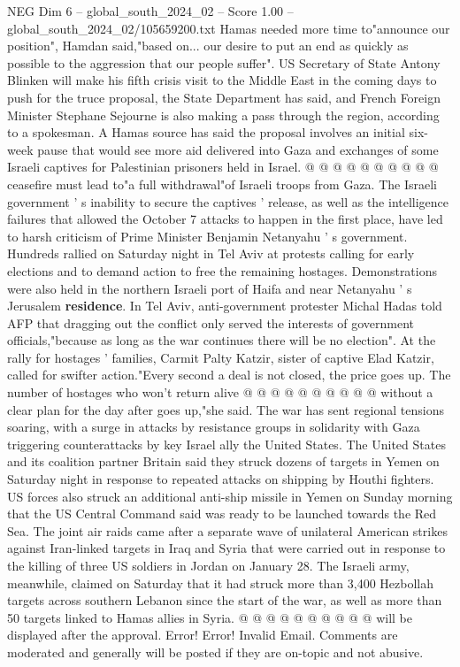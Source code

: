 \begin{textsample}{NEG Dim 6 – global\_south\_2024\_02 – Score 1.00 – global\_south\_2024\_02/105659200.txt}
Hamas needed more time to"announce our position", Hamdan said,"based on... our desire to put an end as quickly as possible to the aggression that our people suffer".
US Secretary of State Antony Blinken will make his fifth crisis visit to the Middle East in the coming days to push for the truce proposal, the State Department has said, and French Foreign Minister Stephane Sejourne is also making a pass through the region, according to a spokesman.
A Hamas source has said the proposal involves an initial six-week pause that would see more aid delivered into Gaza and exchanges of some Israeli captives for Palestinian prisoners held in Israel. @ @ @ @ @ @ @ @ @ @ ceasefire must lead to"a full withdrawal"of Israeli troops from Gaza.
The Israeli government ' s inability to secure the captives ' release, as well as the intelligence failures that allowed the October 7 attacks to happen in the first place, have led to harsh criticism of Prime Minister Benjamin Netanyahu ' s government.
Hundreds rallied on Saturday night in Tel Aviv at protests calling for early elections and to demand action to free the remaining hostages.
Demonstrations were also held in the northern Israeli port of Haifa and near Netanyahu ' s Jerusalem \textbf{residence}.
In Tel Aviv, anti-government protester Michal Hadas told AFP that dragging out the conflict only served the interests of government officials,"because as long as the war continues there will be no election".
At the rally for hostages ' families, Carmit Palty Katzir, sister of captive Elad Katzir, called for swifter action."Every second a deal is not closed, the price goes up.
The number of hostages who won't return alive @ @ @ @ @ @ @ @ @ @ without a clear plan for the day after goes up,"she said.
The war has sent regional tensions soaring, with a surge in attacks by resistance groups in solidarity with Gaza triggering counterattacks by key Israel ally the United States.
The United States and its coalition partner Britain said they struck dozens of targets in Yemen on Saturday night in response to repeated attacks on shipping by Houthi fighters.
US forces also struck an additional anti-ship missile in Yemen on Sunday morning that the US Central Command said was ready to be launched towards the Red Sea.
The joint air raids came after a separate wave of unilateral American strikes against Iran-linked targets in Iraq and Syria that were carried out in response to the killing of three US soldiers in Jordan on January 28.
The Israeli army, meanwhile, claimed on Saturday that it had struck more than 3,400 Hezbollah targets across southern Lebanon since the start of the war, as well as more than 50 targets linked to Hamas allies in Syria. @ @ @ @ @ @ @ @ @ @ will be displayed after the approval.
Error!
Error!
Invalid Email.
Comments are moderated and generally will be posted if they are on-topic and not abusive.

\end{textsample}
